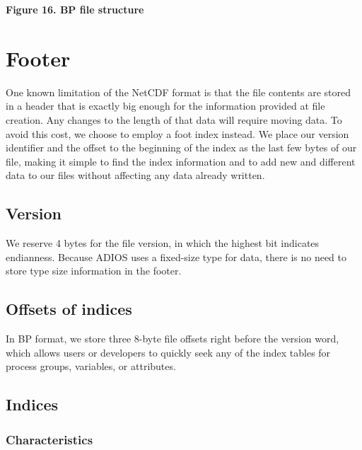 \begin{center}
{\color{color20} \textbf{Figure 16. BP file structure\label{HToc84890270}\label{HToc212016646}\label{HToc212016888}\label{HToc182553417}}}
\end{center}

\section{Footer}

One known limitation of the NetCDF format is that the file contents are stored 
in a header that is exactly big enough for the information provided at file creation. 
Any changes to the length of that data will require moving data. To avoid this 
cost, we choose to employ a foot index instead. We place our version identifier 
and the offset to the beginning of the index as the last few bytes of our file, 
making it simple to find the index information and to add new and different data 
to our files without affecting any data already written. \label{HToc84890271}\label{HToc212016647}\label{HToc212016889}\label{HToc182553418}

\subsection{Version}

We reserve 4 bytes for the file version, in which the highest bit indicates endianness. 
Because ADIOS uses a fixed-size type for data, there is no need to store type size 
information in the footer. 

\subsection{Offsets of indices}

In BP format, we store three 8-byte file offsets right before the version word, 
which allows users or developers to quickly seek any of the index tables for process 
groups, variables, or attributes. 

\subsection{Indices}

\subsubsection{Characteristics}

